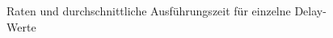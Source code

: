 
\begin{figure}[ht]
	\centering
	\begin{minipage}{0.45\textwidth}
		\centering
		\caption*{(a) Erfolgs- und Fehlerraten}
		
	\end{minipage}
	\begin{minipage}{0.45\textwidth}
		\centering
		\caption*{(b) Ausführungszeiten}
		
	\end{minipage}
	\caption{Raten und durchschnittliche Ausführungszeit für einzelne Delay-Werte}
	\label{fig:d-rateExec}
\end{figure}